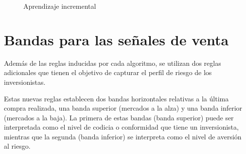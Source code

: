 \documentclass[12pt]{report}
\theoremstyle{break}
\theoremstyle{break}
\begin{document}
\begin{figure}[ht]
\centering
{}
\caption{\label{imagen:aprendizaje_incremental} Aprendizaje incremental}
\end{figure}


\section{Bandas para las señales de venta}
\label{seccion:limites ventas}
Además de las reglas inducidas por cada algoritmo, se utilizan dos reglas adicionales que tienen el objetivo de capturar el perfil de riesgo de los inversionistas.

Estas nuevas reglas establecen dos bandas horizontales relativas a la última compra realizada, una banda superior (mercados a la alza) y una banda inferior (mercados a la baja). La primera de estas bandas (banda superior) puede ser interpretada como el nivel de codicia o conformidad que tiene un inversionista, mientras que la segunda (banda inferior) se interpreta como el nivel de aversión al riesgo.
\end{document}

